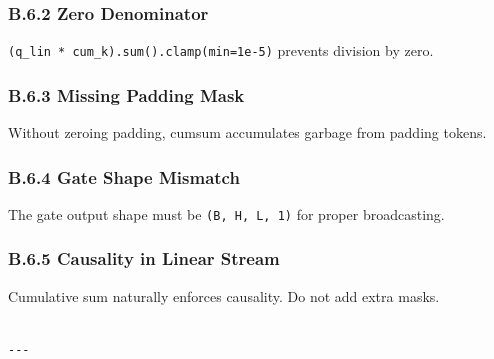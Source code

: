 \subsubsection{B.6.2 Zero Denominator}

\texttt{(q\_lin * cum\_k).sum().clamp(min=1e-5)} prevents division by zero.

\subsubsection{B.6.3 Missing Padding Mask}

Without zeroing padding, cumsum accumulates garbage from padding tokens.

\subsubsection{B.6.4 Gate Shape Mismatch}

The gate output shape must be \texttt{(B, H, L, 1)} for proper broadcasting.

\subsubsection{B.6.5 Causality in Linear Stream}

Cumulative sum naturally enforces causality. Do not add extra masks.
\begin{lstlisting}

---
\end{lstlisting}